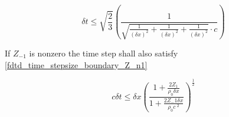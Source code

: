 \begin{equation}\label{fdtd_time_stepsize_boundary}
\delta t \leq \sqrt{\frac{2}{3}}  \left( \frac{1}{\sqrt{\frac{1}{(\delta x)^2}+\frac{1}{(\delta x)^2}+\frac{1}{(\delta x)^2} }\cdot c} \right)
\end{equation}


If $Z_{-1}$ is nonzero the time step shall also satisfy \autoref{fdtd_time_stepsize_boundary_Z_n1}

\begin{equation}\label{fdtd_time_stepsize_boundary_Z_n1}
c \delta t \leq \delta x \left(   \frac{1+\frac{2Z_1}{\rho_0 \delta x}}{1+\frac{2Z_-1 \delta x}{\rho_0 c~^2}}  \right)^{\frac{1}{2}}
\end{equation}





